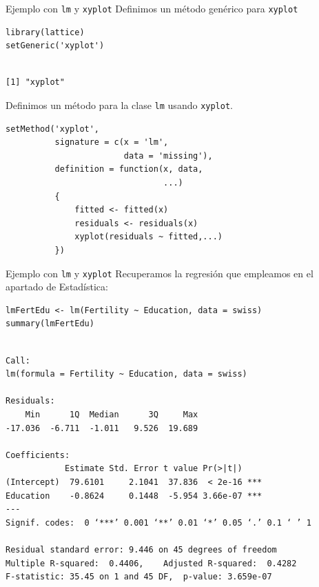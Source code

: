 \documentclass[xcolor={usenames,svgnames,dvipsnames}]{beamer}
\begin{document}
\begin{frame}[label={sec:org2fadb5f},fragile]{Ejemplo con \texttt{lm} y \texttt{xyplot}}
 Definimos un método genérico para \texttt{xyplot}
\lstset{language=r,label= ,caption= ,captionpos=b,numbers=none}
\begin{lstlisting}
library(lattice)
setGeneric('xyplot')
\end{lstlisting}

\begin{verbatim}

[1] "xyplot"
\end{verbatim}


Definimos un método para la clase \texttt{lm} usando \texttt{xyplot}.
\lstset{language=r,label= ,caption= ,captionpos=b,numbers=none}
\begin{lstlisting}
setMethod('xyplot',
          signature = c(x = 'lm',
                        data = 'missing'),
          definition = function(x, data,
                                ...)
          {
              fitted <- fitted(x)
              residuals <- residuals(x)
              xyplot(residuals ~ fitted,...)
          })

\end{lstlisting}
\end{frame}

\begin{frame}[label={sec:org90f1df3},fragile]{Ejemplo con \texttt{lm} y \texttt{xyplot}}
 Recuperamos la regresión que empleamos en el apartado de Estadística:
\lstset{language=r,label= ,caption= ,captionpos=b,numbers=none}
\begin{lstlisting}
lmFertEdu <- lm(Fertility ~ Education, data = swiss)
summary(lmFertEdu)
\end{lstlisting}

\begin{verbatim}

Call:
lm(formula = Fertility ~ Education, data = swiss)

Residuals:
    Min      1Q  Median      3Q     Max 
-17.036  -6.711  -1.011   9.526  19.689 

Coefficients:
            Estimate Std. Error t value Pr(>|t|)    
(Intercept)  79.6101     2.1041  37.836  < 2e-16 ***
Education    -0.8624     0.1448  -5.954 3.66e-07 ***
---
Signif. codes:  0 ‘***’ 0.001 ‘**’ 0.01 ‘*’ 0.05 ‘.’ 0.1 ‘ ’ 1

Residual standard error: 9.446 on 45 degrees of freedom
Multiple R-squared:  0.4406,	Adjusted R-squared:  0.4282 
F-statistic: 35.45 on 1 and 45 DF,  p-value: 3.659e-07
\end{verbatim}
\end{frame}
\end{document}
